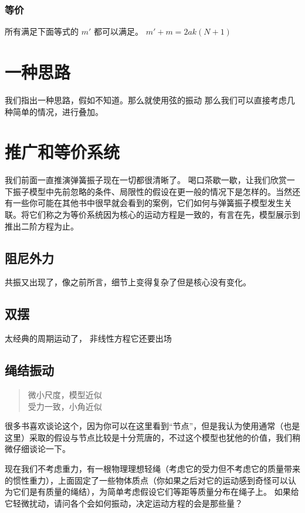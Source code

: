 \documentclass[11pt]{book}
\begin{document}
\subsubsection{等价}
\label{sec:org3643779}
所有满足下面等式的 \(m'\) 都可以满足。
\(m'+m=2ak(N+1)\)

\section{一种思路}
\label{sec:orgab8b61a}
我们指出一种思路，假如不知道。那么就使用弦的振动
那么我们可以直接考虑几种简单的情况，进行叠加。

\section{推广和等价系统}
\label{sec:org41a717e}
我们前面一直推演弹簧振子现在一切都很清晰了。
喝口茶歇一歇，让我们欣赏一下振子模型中先前忽略的条件、局限性的假设在更一般的情况下是怎样的。当然还有一些你可能在其他书中很早就会看到的案例，它们如何与弹簧振子模型发生关联。将它们称之为等价系统因为核心的运动方程是一致的，有言在先，模型展示到推出二阶方程为止。
\subsection{阻尼外力}
\label{sec:orgb9d213a}
共振又出现了，像之前所言，细节上变得复杂了但是核心没有变化。
\subsection{双摆}
\label{sec:orgd856744}
太经典的周期运动了，
非线性方程它还要出场
\subsection{绳结振动}
\label{sec:org0efef87}
\begin{verse}
\vspace*{1em}
微小尺度，模型近似\\[0pt]
受力一致，小角近似\\[0pt]
\end{verse}

很多书喜欢谈论这个，因为你可以在这里看到“节点”，但是我认为使用通常（也是这里）采取的假设与节点比较是十分荒唐的，不过这个模型也犹他的价值，我们稍微仔细谈论一下。

现在我们不考虑重力，有一根物理理想轻绳（考虑它的受力但不考虑它的质量带来的惯性重力），上面固定了一些物体质点（你如果之后对它的运动感到奇怪可以认为它们是有质量的绳结），为简单考虑假设它们等距等质量分布在绳子上。
如果给它轻微扰动，请问各个会如何振动，决定运动方程的会是那些量？
\end{document}
